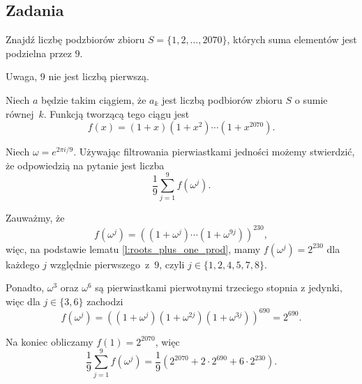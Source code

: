 \documentclass{scrartcl}
\begin{document}
    \subsection{Zadania}
    \begin{problem}
        Znajdź liczbę podzbiorów zbioru $S = \{1,2,\ldots,2070\}$, których suma elementów jest podzielna przez $9$.
        \begin{hint}
            Uwaga, $9$ nie jest liczbą pierwszą.
        \end{hint}
        \begin{answer}
            Niech $a$ będzie takim ciągiem, że $a_k$ jest liczbą podbiorów zbioru $S$ o sumie równej~$k$. Funkcją tworzącą tego ciągu jest
            $$ f(x) = (1 + x)(1 + x^2)\cdots(1 + x^{2070}). $$

            Niech $\omega = e^{2\pi i/9}$. Używając filtrowania pierwiastkami jedności możemy stwierdzić, że odpowiedzią na pytanie jest liczba
            $$ \frac{1}{9}\sum_{j = 1}^9 f(\omega^j). $$

            Zauważmy, że
            $$ f(\omega^j) = \left((1 + \omega^j)\cdots(1 + \omega^{9j})\right)^{230}, $$
            więc, na podstawie lematu \ref{l:roots_plus_one_prod}, mamy $f(\omega^j) = 2^{230}$ dla każdego $j$ względnie pierwszego~z~$9$, czyli $j\in\{1,2,4,5,7,8\}$.

            Ponadto, $\omega^3$ oraz $\omega^6$ są pierwiastkami pierwotnymi trzeciego stopnia z jedynki, więc dla $j\in\{3,6\}$ zachodzi
            $$ f(\omega^j) = \left((1 + \omega^j)(1 + \omega^{2j})(1 + \omega^{3j})\right)^{690} = 2^{690}. $$

            Na koniec obliczamy $f(1) = 2^{2070}$, więc
            $$ \frac{1}{9}\sum_{j = 1}^9 f(\omega^j) = \frac{1}{9}\left(2^{2070} + 2\cdot 2^{690} + 6\cdot 2^{230}\right). $$
        \end{answer}
    \end{problem}
\end{document}
